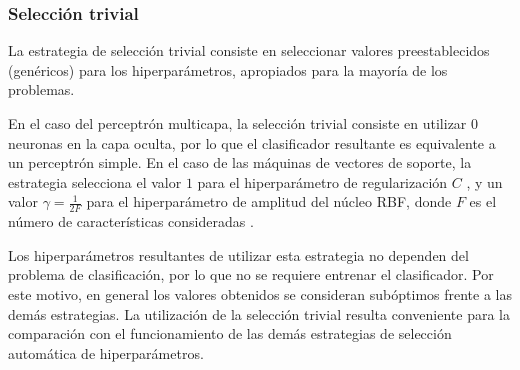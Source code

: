 %
\subsubsection{Selección trivial}
%
La estrategia de selección trivial consiste en seleccionar valores
preestablecidos (genéricos) para los hiperparámetros, apropiados para
la mayoría de los problemas.

En el caso del perceptrón multicapa, la selección trivial consiste en
utilizar $0$ neuronas en la capa oculta, por lo que el clasificador
resultante es equivalente a un perceptrón simple.  En el caso de las
máquinas de vectores de soporte, la estrategia selecciona el valor $1$
para el hiperparámetro de regularización $C$ \cite{libsvm}, y un valor
$\gamma=\frac{1}{2F}$ para el hiperparámetro de amplitud del núcleo
RBF, donde $F$ es el número de características consideradas
\cite{glasmachersigel}.

Los hiperparámetros resultantes de utilizar esta estrategia no
dependen del problema de clasificación, por lo que no se requiere
entrenar el clasificador. Por este motivo, en general los valores
obtenidos se consideran subóptimos frente a las demás estrategias.  La
utilización de la selección trivial resulta conveniente para la
comparación con el funcionamiento de las demás estrategias de
selección automática de hiperparámetros.
